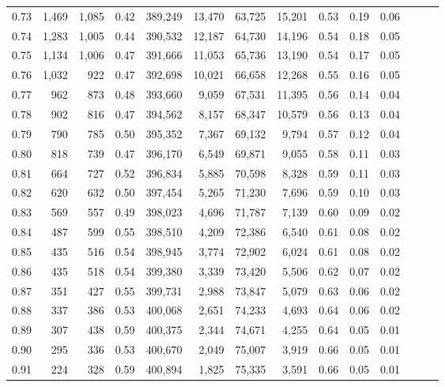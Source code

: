 \begin{tabular}{rrrrrrrrrrrrrr}
0.73 &  1,469 &  1,085 &  0.42 &  389,249 &   13,470 &  63,725 &  15,201 &  0.53 &  0.19 &      0.06 \\
0.74 &  1,283 &  1,005 &  0.44 &  390,532 &   12,187 &  64,730 &  14,196 &  0.54 &  0.18 &      0.05 \\
0.75 &  1,134 &  1,006 &  0.47 &  391,666 &   11,053 &  65,736 &  13,190 &  0.54 &  0.17 &      0.05 \\
0.76 &  1,032 &    922 &  0.47 &  392,698 &   10,021 &  66,658 &  12,268 &  0.55 &  0.16 &      0.05 \\
0.77 &    962 &    873 &  0.48 &  393,660 &    9,059 &  67,531 &  11,395 &  0.56 &  0.14 &      0.04 \\
0.78 &    902 &    816 &  0.47 &  394,562 &    8,157 &  68,347 &  10,579 &  0.56 &  0.13 &      0.04 \\
0.79 &    790 &    785 &  0.50 &  395,352 &    7,367 &  69,132 &   9,794 &  0.57 &  0.12 &      0.04 \\
0.80 &    818 &    739 &  0.47 &  396,170 &    6,549 &  69,871 &   9,055 &  0.58 &  0.11 &      0.03 \\
0.81 &    664 &    727 &  0.52 &  396,834 &    5,885 &  70,598 &   8,328 &  0.59 &  0.11 &      0.03 \\
0.82 &    620 &    632 &  0.50 &  397,454 &    5,265 &  71,230 &   7,696 &  0.59 &  0.10 &      0.03 \\
0.83 &    569 &    557 &  0.49 &  398,023 &    4,696 &  71,787 &   7,139 &  0.60 &  0.09 &      0.02 \\
0.84 &    487 &    599 &  0.55 &  398,510 &    4,209 &  72,386 &   6,540 &  0.61 &  0.08 &      0.02 \\
0.85 &    435 &    516 &  0.54 &  398,945 &    3,774 &  72,902 &   6,024 &  0.61 &  0.08 &      0.02 \\
0.86 &    435 &    518 &  0.54 &  399,380 &    3,339 &  73,420 &   5,506 &  0.62 &  0.07 &      0.02 \\
0.87 &    351 &    427 &  0.55 &  399,731 &    2,988 &  73,847 &   5,079 &  0.63 &  0.06 &      0.02 \\
0.88 &    337 &    386 &  0.53 &  400,068 &    2,651 &  74,233 &   4,693 &  0.64 &  0.06 &      0.02 \\
0.89 &    307 &    438 &  0.59 &  400,375 &    2,344 &  74,671 &   4,255 &  0.64 &  0.05 &      0.01 \\
0.90 &    295 &    336 &  0.53 &  400,670 &    2,049 &  75,007 &   3,919 &  0.66 &  0.05 &      0.01 \\
0.91 &    224 &    328 &  0.59 &  400,894 &    1,825 &  75,335 &   3,591 &  0.66 &  0.05 &      0.01 \\

\end{tabular}
